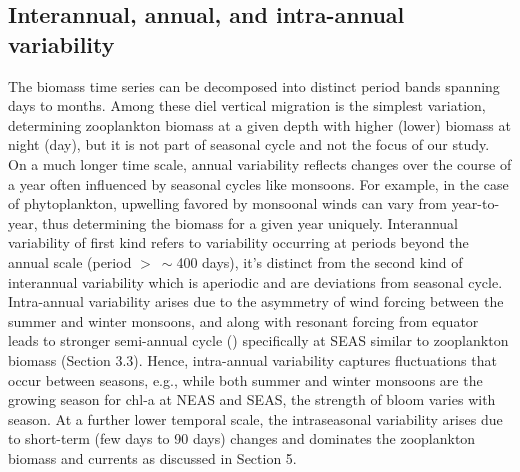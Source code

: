 \documentclass[authoryear,review,12pt]{elsarticle}
\begin{document}
	\subsection{Interannual, annual, and intra-annual variability}
	\label{sec:seasonal_cycle}
	The biomass time series can be decomposed into distinct period bands spanning days to months. Among these diel vertical migration is the simplest variation, determining zooplankton biomass at a given depth with higher (lower) biomass at night (day), but it is not part of seasonal cycle and not the focus of our study. On a much longer time scale,  annual variability reflects changes over the course of a year often influenced by seasonal cycles like monsoons. For example, in the case of phytoplankton, upwelling favored by monsoonal winds can vary from year-to-year, thus determining the biomass for a given year uniquely. Interannual variability of first kind refers to variability occurring at periods beyond the annual scale (period $>~\sim$400 days), it's distinct from the second kind of interannual variability which is aperiodic and are deviations from seasonal cycle. Intra-annual variability arises due to the asymmetry of wind forcing between the summer and winter monsoons, and along with resonant forcing from equator leads to stronger semi-annual cycle (\citep{jensen2001arabian,schott20011}) specifically at SEAS similar to zooplankton biomass (Section 3.3). Hence, intra-annual variability captures fluctuations that occur between seasons, e.g., while both summer and winter monsoons are the growing season for chl-a at NEAS and SEAS, the strength of bloom varies with season. At a further lower temporal scale, the intraseasonal variability arises due to short-term (few days to 90 days) changes and dominates the zooplankton biomass and currents as discussed in Section 5.
	
\end{document}
